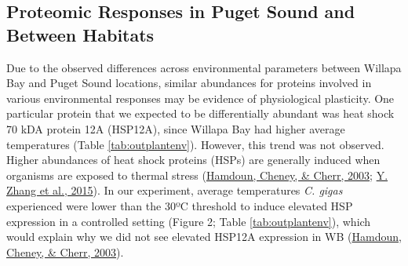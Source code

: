 \documentclass [11pt, proquest] {uwthesis}[2015/03/03]
\begin{document}
\hypertarget{proteomic-responses-in-puget-sound-and-between-habitats}{%
\subsection{Proteomic Responses in Puget Sound and Between Habitats}\label{proteomic-responses-in-puget-sound-and-between-habitats}}

Due to the observed differences across environmental parameters between Willapa Bay and Puget Sound locations, similar abundances for proteins involved in various environmental responses may be evidence of physiological plasticity. One particular protein that we expected to be differentially abundant was heat shock 70 kDA protein 12A (HSP12A), since Willapa Bay had higher average temperatures (Table \ref{tab:outplantenv}). However, this trend was not observed. Higher abundances of heat shock proteins (HSPs) are generally induced when organisms are exposed to thermal stress (\protect\hyperlink{ref-Hamdoun2003}{Hamdoun, Cheney, \& Cherr, 2003}; \protect\hyperlink{ref-Zhang2015}{Y. Zhang et al., 2015}). In our experiment, average temperatures \emph{C. gigas} experienced were lower than the 30ºC threshold to induce elevated HSP expression in a controlled setting (Figure 2; Table \ref{tab:outplantenv}), which would explain why we did not see elevated HSP12A expression in WB (\protect\hyperlink{ref-Hamdoun2003}{Hamdoun, Cheney, \& Cherr, 2003}).
\end{document}
